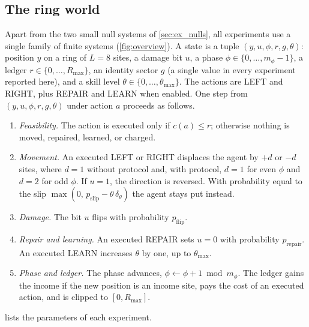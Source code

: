 \subsection{The ring world}
\label{sec:ringworld}
Apart from the two small null systems of \cref{sec:ex_nulls}, all experiments use a single family of finite systems (\cref{fig:overview}). A state is a tuple $(y,u,\phi,r,g,\theta)$: position $y$ on a ring of $L=8$ sites, a damage bit $u$, a phase $\phi\in\{0,\dots,m_\phi-1\}$, a ledger $r\in\{0,\dots,R_{\max}\}$, an identity sector $g$ (a single value in every experiment reported here), and a skill level $\theta\in\{0,\dots,\theta_{\max}\}$. The actions are LEFT and RIGHT, plus REPAIR and LEARN when enabled. One step from $(y,u,\phi,r,g,\theta)$ under action $a$ proceeds as follows.
\begin{enumerate}[leftmargin=*, itemsep=0.2em]
  \item \emph{Feasibility.} The action is executed only if $c(a)\le r$; otherwise nothing is moved, repaired, learned, or charged.
  \item \emph{Movement.} An executed LEFT or RIGHT displaces the agent by $+d$ or $-d$ sites, where $d=1$ without protocol and, with protocol, $d=1$ for even $\phi$ and $d=2$ for odd $\phi$. If $u=1$, the direction is reversed. With probability equal to the slip $\max(0,\,p_{\mathrm{slip}}-\theta\,\delta_\theta)$ the agent stays put instead.
  \item \emph{Damage.} The bit $u$ flips with probability $p_{\mathrm{flip}}$.
  \item \emph{Repair and learning.} An executed REPAIR sets $u=0$ with probability $p_{\mathrm{repair}}$. An executed LEARN increases $\theta$ by one, up to $\theta_{\max}$.
  \item \emph{Phase and ledger.} The phase advances, $\phi\leftarrow\phi+1 \bmod m_\phi$. The ledger gains the income if the new position is an income site, pays the cost of an executed action, and is clipped to $[0,R_{\max}]$.
\end{enumerate}
 lists the parameters of each experiment.


